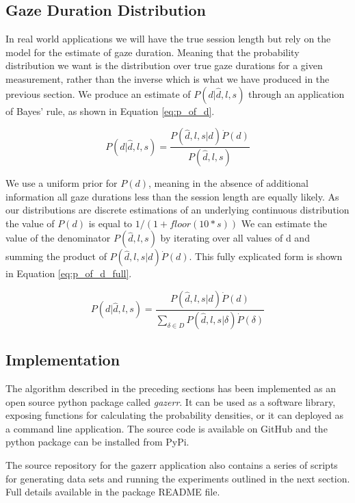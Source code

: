 \documentclass[12pt,a4paper]{article}
\numberwithin{equation}{section}
\begin{document}
\subsection{Gaze Duration Distribution}

In real world applications we will have the true session length but rely on the model for the 
estimate of gaze duration. Meaning that the probability distribution we want is the distribution 
over true gaze durations for a given measurement, rather than the inverse which is what we 
have produced in the previous section. We produce an estimate of $P(d|\hat{d},l,s)$
through an application of Bayes' rule, as shown in Equation \ref{eq:p_of_d}.

\begin{equation}
\label{eq:p_of_d}
P(d|\hat{d},l,s) =  \frac{ P(\hat{d},l,s|d) \dot P(d) }{ P(\hat{d},l,s)  }
\end{equation}

We use a uniform prior for $P(d)$, meaning in the absence of additional information all
gaze durations less than the session length are equally likely. As our distributions are
discrete estimations of an underlying continuous distribution the value of $P(d)$ is
equal to $1/(1+floor(10*s))$
 We can estimate the value
of the denominator $P(\hat{d},l,s)$ by iterating over all values of d and summing the product
of $ P(\hat{d},l,s|d) \dot P(d)$. This fully explicated form is shown in 
Equation \ref{eq:p_of_d_full}.

\begin{equation}
\label{eq:p_of_d_full}
P(d|\hat{d},l,s) =  \frac{ P(\hat{d},l,s|d) \dot P(d) }{ \sum_{\delta \in D} P(\hat{d},l,s|\delta) \dot P(\delta)  }
\end{equation}

\subsection{Implementation}

The algorithm described in the preceding sections has been implemented as an open source python 
package called \textit{gazerr}. 
It can be used as a software library, exposing functions for calculating the probability densities,
or it can deployed as a command line application. 
The source code is available on GitHub and the python package can be installed from PyPi.

The source repository for the gazerr application also contains a series of scripts for generating data
sets and running the experiments outlined in the next section. Full details available in the package
README file.
\end{document}
